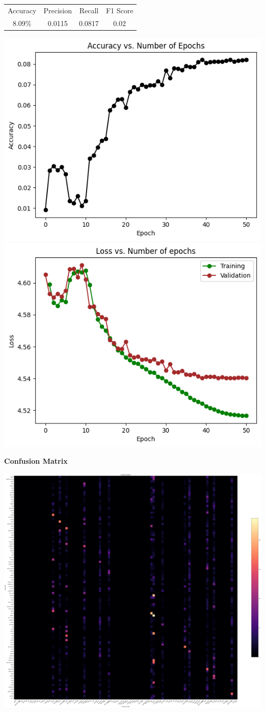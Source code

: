 \documentclass{article}
\begin{document}
\begin{center}
\begin{tabular}{ |c|c|c|c| } 
 \hline
 Accuracy & Precision & Recall & F1 Score \\ 
 8.09\% & 0.0115 & 0.0817 & 0.02 \\
 \hline
\end{tabular}
\end{center}

\includegraphics[width=0.5\linewidth]{images/Softmax/accvsloss.png}
\includegraphics[width=0.5\linewidth]{images/Softmax/lossvsepochs.png}
\newline


\textbf{Confusion Matrix}

\includegraphics[width=0.9\linewidth]{images/Softmax/highres-softmax-resnet12.png}
\end{document}
